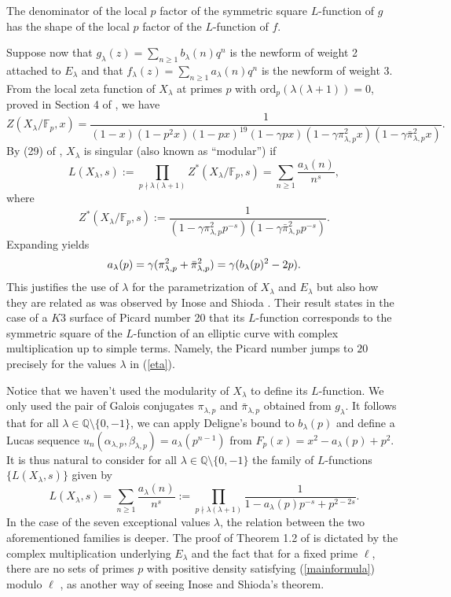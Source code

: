 \documentclass[12pt]{amsart}
\newcommand{\ord}{\mathrm{ord}}
\newcommand{\Q}{\mathbb{Q}}
\newcommand{\F}{\mathbb{F}}
\newcommand{\pil}{\pi_{\lambda,p}}
\newcommand{\pilb}{\bar{\pi}_{\lambda,p}}
\numberwithin{equation}{section}
\begin{document}
The denominator of the local $p$ factor of the symmetric square $L$-function of $g$ has the shape of the local $p$ factor of the $L$-function of $f$.

Suppose now that $g_\lambda(z)=\sum_{n\geq 1}b_\lambda(n)q^n$ is the newform of weight 2 attached to $E_\lambda$ and that $f_\lambda(z)=\sum_{n\geq 1}a_\lambda(n)q^n$ is the newform of weight $3$. From the local zeta function of $X_\lambda$ at primes $p$ with $\ord_p(\lambda(\lambda+1))=0$, proved in Section 4 of \cite{AOP}, we have $$Z(X_\lambda/\F_p,x)=\frac{1}{(1-x)(1-p^2x)(1-px)^{19}(1-\gamma px)(1-\gamma\pil^2x)(1-\gamma\pilb^2x)}.$$ By (29) of \cite{AOP}, $X_\lambda$ is singular (also known as ``modular'') if $$L(X_\lambda,s):=\prod_{p\nmid \lambda(\lambda+1)} Z^*(X_\lambda/\F_p,s)=\sum_{n\geq 1}\frac{a_\lambda(n)}{n^s},$$ where $$Z^*(X_\lambda/\F_p,s):=\frac{1}{(1-\gamma\pil^2p^{-s})(1-\gamma\pilb^2 p^{-s})}.$$ Expanding yields 
\begin{equation}{\label{mainformula}}
a_\lambda(p)=\gamma(\pil^2+\pilb^2)=\gamma(b_\lambda(p)^2-2p).  
\end{equation}
This justifies the use of $\lambda$ for the parametrization of $X_\lambda$ and $E_\lambda$ but also how they are related as was observed by Inose and Shioda \cite{IS}. Their result states in the case of a $K3$ surface of Picard number 20 that its $L$-function corresponds to the symmetric square of the $L$-function of an elliptic curve with complex multiplication up to simple terms. Namely, the Picard number jumps to $20$ precisely for the values $\lambda$ in (\ref{eta}).

Notice that we haven't used the modularity of $X_\lambda$ to define its $L$-function. We only used the pair of Galois conjugates $\pil$ and $\pilb$ obtained from $g_\lambda$. It follows that for all $\lambda\in \Q\setminus\{0,-1\}$, we can apply Deligne's bound to $b_\lambda(p)$ and define a Lucas sequence $u_n(\alpha_{\lambda,p},\beta_{\lambda,p})=a_\lambda(p^{n-1})$ from $F_p(x)=x^2-a_\lambda(p)+p^2$. It is thus natural to consider for all $\lambda\in \Q\setminus \{0,-1\}$ the family of $L$-functions $\{L(X_\lambda,s)\}$ given by $$L(X_\lambda,s)=\sum_{n\geq 1}\frac{a_\lambda(n)}{n^s}:=\prod_{p\nmid \lambda(\lambda+1)}\frac{1}{1-a_\lambda(p)p^{-s}+p^{2-2s}}.$$ 
In the case of the seven exceptional values $\lambda$, the relation between the two aforementioned families is deeper. The proof of Theorem 1.2 of \cite{AOP} is dictated by the complex multiplication underlying $E_\lambda$ and the fact that for a fixed prime $\ell$, there are no sets of primes $p$ with positive density satisfying (\ref{mainformula}) modulo $\ell$ \cite{OS,Ribet}, as another way of seeing Inose and Shioda's theorem.
\end{document}
